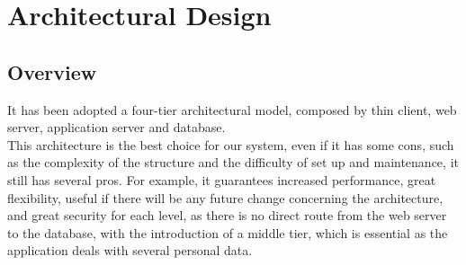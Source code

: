 

%

\newpage
	\section{Architectural Design}
		\subsection{Overview}
				It has been adopted a four-tier architectural model, composed by thin client, web server, application server and database.\\ This architecture is the best choice for our system, even if it has some cons, such as the complexity of the structure and the difficulty of set up and maintenance, it still has several pros. For example, it guarantees increased performance, great flexibility, useful if there will be any future change concerning the architecture, and great security for each level, as there is no direct route from the web server to the database, with the introduction of a middle tier, which is essential as the application deals with several personal data.
\newpage
